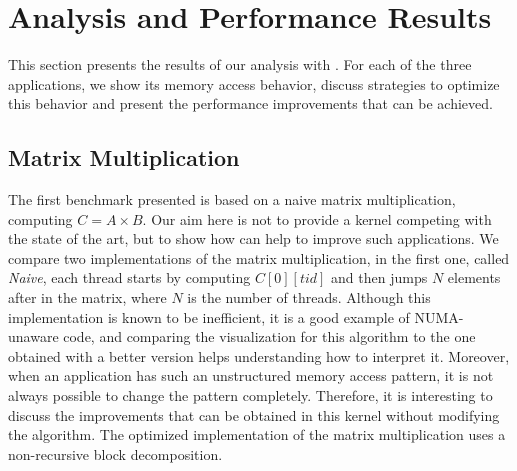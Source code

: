 \section{Analysis and Performance Results}
\label{sec:expe-analysis}

This section presents the results of our analysis with \TABARNAC.
For each of the three applications, we show its memory access behavior, discuss strategies to optimize this behavior and present the performance improvements that can be achieved.


\subsection{Matrix Multiplication}
\label{sec:exp-mat}

The first benchmark presented is based on a naive matrix multiplication,
computing $C=A \times B$. Our aim here is not to provide a kernel competing with the
state of the art, but to show how \TABARNAC can help to improve such
applications. We compare two implementations of the matrix multiplication, in
the first one, called \emph{Naive}, each thread starts by computing
$C[0][tid]$ and then jumps $N$ elements after in the matrix, where $N$ is the
number of threads. Although this implementation is known to be inefficient, it is a
good example of NUMA-unaware code, and comparing the \TABARNAC visualization
for this algorithm to the one obtained with a better version helps understanding
how to interpret it.
Moreover, when an application has such an unstructured memory access pattern, it
is not always possible to change the pattern completely. Therefore, it is
interesting to discuss the improvements that can be obtained in this kernel without
modifying the algorithm.
The optimized implementation of the matrix multiplication uses a non-recursive block
decomposition.




